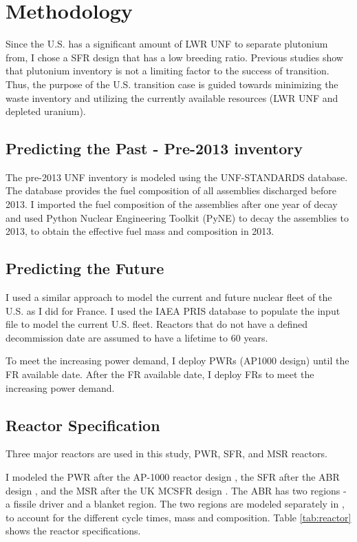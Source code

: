 \section{Methodology}

Since the U.S. has a significant amount of \gls{LWR} \gls{UNF}
to separate plutonium from, I chose a \gls{SFR} design that has a low breeding ratio.
Previous studies \cite{worrall_utilization_2013} show that plutonium inventory
is not a limiting factor to the success of transition. Thus, the purpose
of the U.S. transition case is guided towards minimizing the waste inventory
and utilizing the currently available resources (\gls{LWR} \gls{UNF} and
depleted uranium).

\subsection{Predicting the Past - Pre-2013 inventory}
The pre-2013 \gls{UNF} inventory is modeled using the \gls{UNF-STANDARDS}
database. The database provides the fuel composition of all assemblies
discharged before 2013. I imported the fuel composition of the assemblies
after one year of decay and used Python Nuclear Engineering Toolkit (PyNE) \cite{scopatz_pyne_2012}
to decay the assemblies to 2013, to obtain the effective fuel mass and composition
in 2013.

\subsection{Predicting the Future}
I used a similar approach to model the current and future nuclear fleet of the
U.S. as I did for France. I used the \gls{IAEA} \gls{PRIS} database to populate
the \Cyclus input file to model the current U.S. fleet. Reactors that do not
have a defined decommission date are assumed to have a lifetime to 60 years.

To meet the increasing power demand, I deploy \glspl{PWR} (AP1000 design)
until the \gls{FR} available date. After the \gls{FR} available date,
I deploy \glspl{FR} to meet the increasing power demand.

\subsection{Reactor Specification}
Three major reactors are used in this study, \gls{PWR}, \gls{SFR}, and
\gls{MSR} reactors.

I modeled the \gls{PWR} after the AP-1000 reactor design \cite{sutharshan_ap1000tm_2011},
the \gls{SFR} after the \gls{ABR} design \cite{kim_core_2009}, and the 
\gls{MSR} after the \gls{UK} \gls{MCSFR} design \cite{smith_assessment_1974}. The \gls{ABR} has two regions -
a fissile driver and a blanket region. The two regions are modeled separately in \Cyclus,
to account for the different cycle times, mass and composition. Table \ref{tab:reactor} shows
the reactor specifications. 


